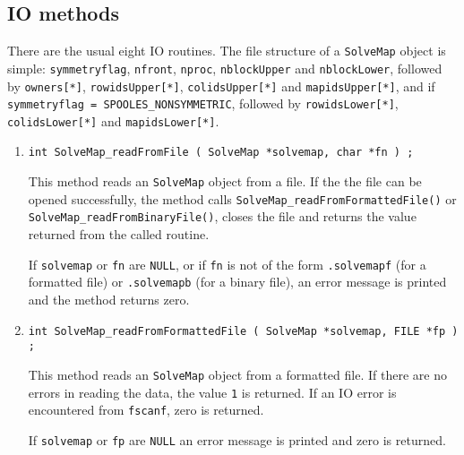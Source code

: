 \subsection{IO methods}
\label{subsection:SolveMap:proto:IO}
\par
There are the usual eight IO routines.
The file structure of a {\tt SolveMap} object is simple:
{\tt symmetryflag}, {\tt nfront}, {\tt nproc}, {\tt nblockUpper}
and {\tt nblockLower},
followed by {\tt owners[*]},
{\tt rowidsUpper[*]},
{\tt colidsUpper[*]} and
{\tt mapidsUpper[*]},
and if {\tt symmetryflag = SPOOLES\_NONSYMMETRIC},
followed by 
{\tt rowidsLower[*]},
{\tt colidsLower[*]} and
{\tt mapidsLower[*]}.
\par
\begin{enumerate}
\item
\begin{verbatim}
int SolveMap_readFromFile ( SolveMap *solvemap, char *fn ) ;
\end{verbatim}
\par
This method reads an {\tt SolveMap} object from a file.
If the the file can be opened successfully, 
the method calls {\tt SolveMap\_readFromFormattedFile()} or
{\tt SolveMap\_readFromBinaryFile()}, 
closes the file
and returns the value returned from the called routine.
\par {}
If {\tt solvemap} or {\tt fn} are {\tt NULL}, 
or if {\tt fn} is not of the form
{\tt *.solvemapf} (for a formatted file) 
or {\tt *.solvemapb} (for a binary file),
an error message is printed and the method returns zero.
\item
\begin{verbatim}
int SolveMap_readFromFormattedFile ( SolveMap *solvemap, FILE *fp ) ;
\end{verbatim}
\par
This method reads an {\tt SolveMap} object from a formatted file.
If there are no errors in reading the data, 
the value {\tt 1} is returned.
If an IO error is encountered from {\tt fscanf}, zero is returned.
\par {}
If {\tt solvemap} or {\tt fp} are {\tt NULL} 
an error message is printed and zero is returned.

\end{enumerate}
